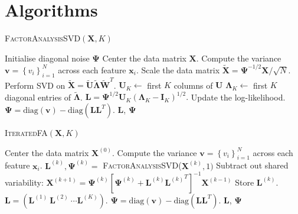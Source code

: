 \documentclass[12pt]{article}
\begin{document}
\section{Algorithms}
\begin{algorithm}
	\caption{\textsc{FactorAnalysisSVD}$(\mathbf{X}, K)$}\label{euclid}
	\begin{algorithmic}[1]
		\State Initialise diagonal noise $\boldsymbol{\Psi}$
		\State Center the data matrix $\mathbf{X}$.
		\State Compute the variance $\mathbf{v} = \left\{v_i\right\}_{i=1}^N$ across each feature $\mathbf{x}_i$.
		\State Scale the data matrix $\tilde{\mathbf{X}} = \boldsymbol{\Psi}^{-1/2} \mathbf{X}/\sqrt{N}$.
		\State Perform SVD on $\tilde{\mathbf{X}} = \tilde{\mathbf{U}}\tilde{\boldsymbol{\Lambda}}\tilde{\mathbf{W}}^T$.
		\State $\mathbf{U}_K \leftarrow$ first $K$ columns of $\mathbf{U}$
		\State $\mathbf{\Lambda}_K \leftarrow$ first $K$ diagonal entries of $\tilde{\boldsymbol{\Lambda}}$.
		\State $\mathbf{L} = \boldsymbol{\Psi}^{1/2} \mathbf{U}_K(\boldsymbol{\Lambda}_K - \mathbf{I}_K)^{1/2}.$
		\State Update the log-likelihood.
		\State $\boldsymbol{\Psi} = \text{diag}(\mathbf{v}) - \text{diag}(\mathbf{LL}^T)$.
		\EndWhile
		\State
		\Return $\mathbf{L}$, $\boldsymbol{\Psi}$
	\end{algorithmic}
\end{algorithm}
\begin{algorithm}
	\caption{\textsc{IteratedFA}$(\mathbf{X}, K)$}\label{euclid}
	\begin{algorithmic}[1]
		\State Center the data matrix $\mathbf{X}^{(0)}$.
		\State Compute the variance $\mathbf{v} = \left\{v_i\right\}_{i=1}^N$ across each feature $\mathbf{x}_i$.
		\State $\mathbf{L}^{(k)}, \boldsymbol{\Psi}^{(k)}=$ \textsc{FactorAnalysisSVD}($\mathbf{X}^{(k)}, 1)$
		\State Subtract out shared variability: $\mathbf{X}^{(k+1)} = \boldsymbol{\Psi}^{(k)}\left[\boldsymbol{\Psi}^{(k)} + \mathbf{L}^{(k)}{\mathbf{L}^{(k)}}^T\right]^{-1} \mathbf{X}^{(k-1)}$
		\State Store $\mathbf{L}^{(k)}$.
		\EndFor
		\State $\mathbf{L}=\left(\mathbf{L}^{(1)} \ \mathbf{L}^{(2)} \ \cdots \mathbf{L}^{(K)}\right)$.
		\State $\boldsymbol{\Psi} = \text{diag}(\mathbf{v}) - \text{diag}(\mathbf{LL}^T)$.
		\State
		\Return $\mathbf{L}$, $\boldsymbol{\Psi}$
	\end{algorithmic}
\end{algorithm}
\end{document}
